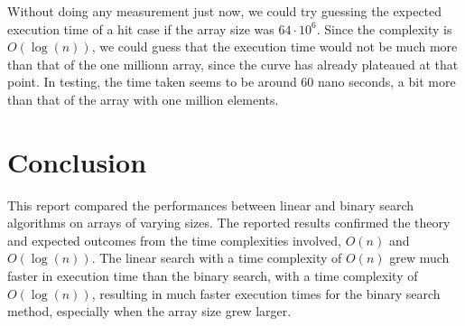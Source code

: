 \documentclass[a4paper,11pt]{article}
\begin{document}
  Without doing any measurement just now, we could try guessing the expected execution time of a hit case if the array size was $64 \cdot 10^6$.
  Since the complexity is $O(\log(n))$, we could guess that the execution time would not be much more than that of the one millionn array,
  since the curve has already plateaued at that point.
  In testing, the time taken seems to be around 60 nano seconds, a bit more than that of the array with one million elements.

\section*{Conclusion}
This report compared the performances between linear and binary search algorithms on arrays of varying sizes.
The reported results confirmed the theory and expected outcomes from the time complexities involved, $O(n)$ and $O(\log(n))$.
The linear search with a time complexity of $O(n)$ grew much faster in execution time than the binary search,
  with a time complexity of $O(\log(n))$, resulting in much faster execution times for the binary search method, especially when the array size grew larger.
\end{document}
